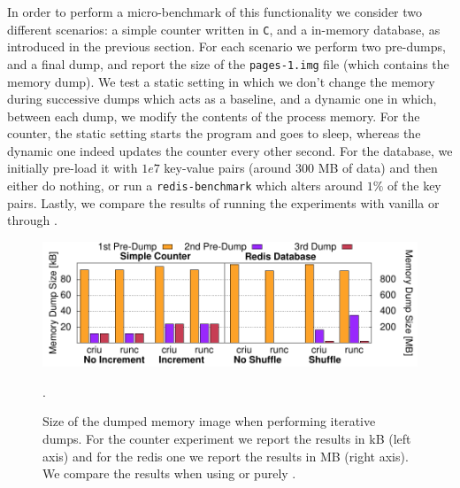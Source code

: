 
In order to perform a micro-benchmark of this functionality we consider two different scenarios: a simple counter written in \texttt{C}, and a \redis in-memory database, as introduced in the previous section.
For each scenario we perform two pre-dumps, and a final dump, and report the size of the \texttt{pages-1.img} file (which contains the memory dump).
We test a static setting in which we don't change the memory during successive dumps which acts as a baseline, and a dynamic one in which, between each dump, we modify the contents of the process memory.
For the counter, the static setting starts the program and goes to sleep, whereas the dynamic one indeed updates the counter every other second.
For the database, we initially pre-load it with $1e7$ key-value pairs (around 300 MB of data) and then either do nothing, or run a \texttt{redis-benchmark} which alters around $1\%$ of the key pairs.
Lastly, we compare the results of running the experiments with vanilla \criu or through \runc.

\begin{figure}[h!]
    \centering
    \includegraphics[width=.8\textwidth]{figs/iterative-migration-microbenchmark/iterative_migration_microbenchmark.pdf}
    \caption[Size of the memory image for iterative dumps.]{Size of the dumped memory image when performing iterative dumps. For the counter experiment we report the results in kB (left axis) and for the redis one we report the results in MB (right axis). We compare the results when using \runc or purely \criu.\label{fig:iterative-migration-microbenchmark}}.
\end{figure}

